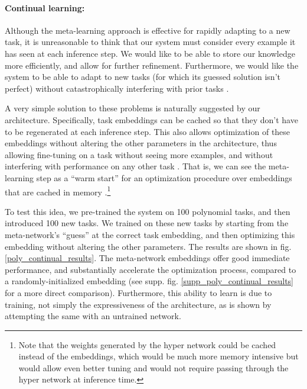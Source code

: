 \documentclass{article}
\begin{document}
\paragraph{Continual learning:} Although the meta-learning approach is effective for rapidly adapting to a new task, it is unreasonable to think that our system must consider every example it has seen at each inference step. We would like to be able to store our knowledge more efficiently, and allow for further refinement. Furthermore, we would like the system to be able to adapt to new tasks (for which its guessed solution isn't perfect) without catastrophically interfering with prior tasks \citep{McCloskey1989}. \par
A very simple solution to these problems is naturally suggested by our architecture. Specifically, task embeddings can be cached so that they don't have to be regenerated at each inference step. This also allows optimization of these embeddings without altering the other parameters in the architecture, thus allowing fine-tuning on a task without seeing more examples, and without interfering with performance on any other task \citep[c.f.][]{Rumelhart1993, Lampinen2018a}. That is, we can see the meta-learning step as a ``warm start'' for an optimization procedure over embeddings that are cached in memory \citep[c.f.][]{Kumaran2016}.\footnote{Note that the weights generated by the hyper network could be cached instead of the embeddings, which would be much more memory intensive but would allow even better tuning and would not require passing through the hyper network at inference time.} \par 
To test this idea, we pre-trained the system on 100 polynomial tasks, and then introduced 100 new tasks. We trained on these new tasks by starting from the meta-network's ``guess'' at the correct task embedding, and then optimizing this embedding without altering the other parameters. The results are shown in fig. \ref{poly_continual_results}. The meta-network embeddings offer good immediate performance, and substantially accelerate the optimization process, compared to a randomly-initialized embedding (see supp. fig. \ref{supp_poly_continual_results} for a more direct comparison). Furthermore, this ability to learn is due to training, not simply the expressiveness of the architecture, as is shown by attempting the same with an untrained network. \par 
\end{document}
